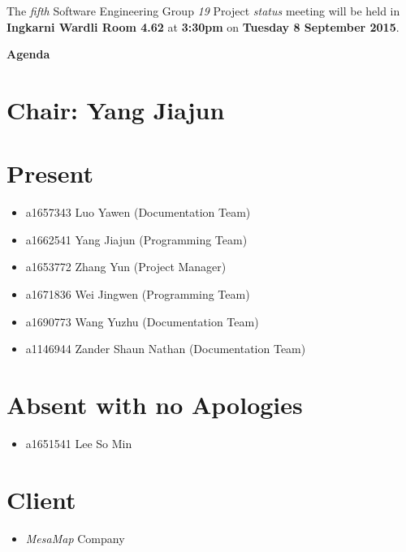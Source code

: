 \documentclass[a4paper] {article}
\begin{document}
	
	\vspace*{-50pt}
	
	\noindent The \emph{fifth} Software Engineering Group \emph{19} Project \emph{status} meeting will
	be held in \textbf{Ingkarni Wardli Room 4.62} at \textbf {3:30pm} on \textbf{Tuesday 8 September 2015}.
	
	
	\begin{center}
		\huge \textbf {Agenda}
	\end{center}
	

	\section*{Chair: Yang Jiajun}
	
	\vspace*{10pt}
	
	\section{Present}
	\begin{itemize}
		\item a1657343 Luo Yawen (Documentation Team)
		\item a1662541 Yang Jiajun (Programming Team)
		\item a1653772 Zhang Yun (Project Manager)
		\item a1671836 Wei Jingwen (Programming Team)
		\item a1690773 Wang Yuzhu (Documentation Team)
		\item a1146944 Zander Shaun Nathan (Documentation Team)
	\end{itemize}
	
	\section{Absent with no Apologies}
	\begin{itemize}
		\item a1651541 Lee So Min
	\end{itemize}  
	
        \section{Client}
        \begin{itemize}
            \item \emph{MesaMap} Company
        \end{itemize} 
	
\end{document}
